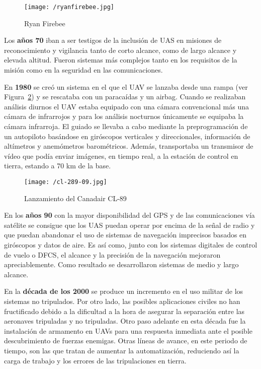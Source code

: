 \begin{figure}[!h]
\begin{center}
\texttt{[image: /ryanfirebee.jpg]}
\caption[Ryan Firebee]{Ryan Firebee}
\label{fig:ryanfirebee}
\end{center}
\end{figure}

\clearpage

Los \textbf{años 70} iban a ser testigos de la inclusión de \acs{UAS} en misiones de 
reconocimiento y vigilancia tanto de corto alcance, como de largo alcance y elevada altitud. Fueron sistemas 
más complejos tanto en los requisitos de la misión como en la seguridad en las comunicaciones.

En \textbf{1980} se creó un sistema en el que el \acs{UAV} se lanzaba desde una rampa (ver Figura~\ref{fig:cl89}) y se rescataba con un paracaídas y un airbag. 
Cuando se realizaban análisis diurnos el \acs{UAV} estaba equipado con una cámara convencional más una cámara de infrarrojos y para los análisis nocturnos únicamente se equipaba la cámara infrarroja. El guiado se llevaba a cabo mediante la preprogramación de un autopiloto basándose en giróscopos verticales y direccionales, información de altímetros y anemómetros barométricos. 
Además, transportaba un transmisor de vídeo que podía enviar imágenes, en tiempo real, a la estación de control 
en tierra, estando a 70 km de la base.

\begin{figure}[!h]
\begin{center}
\texttt{[image: /cl-289-09.jpg]}
\caption[Lanzamiento del Canadair CL-89]{Lanzamiento del Canadair CL-89}
\label{fig:cl89}
\end{center}
\end{figure}

En los \textbf{años 90} con la mayor disponibilidad del \acs{GPS} y de las comunicaciones vía satélite se consigue que los \acs{UAS} puedan operar por encima de la señal de radio y que puedan abandonar el uso de sistemas de navegación imprecisos basados en giróscopos y
datos de aire. Es así como, junto con los sistemas digitales de control de vuelo o \acs{DFCS}, el alcance y la precisión de la navegación mejoraron apreciablemente. 
Como resultado se desarrollaron sistemas de medio y largo alcance. 

En la \textbf{década de los 2000} se produce un incremento en el uso militar de los sistemas no tripulados. 
Por otro lado, las posibles aplicaciones civiles no han fructificado debido a la dificultad a la hora de asegurar la 
separación entre las aeronaves tripuladas y no tripuladas.
Otro paso adelante en esta década fue la instalación de armamento en \acs{UAV}s para una respuesta inmediata ante el posible 
descubrimiento de fuerzas enemigas.
Otras líneas de avance, en este periodo de tiempo, son las que tratan de aumentar la automatización, reduciendo así
la carga de trabajo y los errores de las tripulaciones en tierra.

